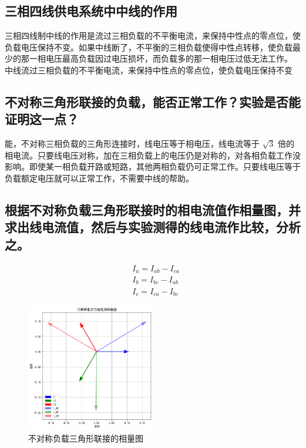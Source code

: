 \documentclass{article}
\begin{document}
\subsection{三相四线供电系统中中线的作用}
三相四线制中线的作用是流过三相负载的不平衡电流，来保持中性点的零点位，使负载电压保持不变。如果中线断了，不平衡的三相负载使得中性点转移，使负载最少的那一相电压最高负载因过电压损坏，而负载多的那一相电压过低无法工作。
中线流过三相负载的不平衡电流，来保持中性点的零点位，使负载电压保持不变



\subsection{不对称三角形联接的负载，能否正常工作？实验是否能证明这一点？ }
能，不对称三相负载的三角形连接时，线电压等于相电压，线电流等于 $\sqrt{3}$ 倍的相电流。只要线电压对称，加在三相负载上的电压仍是对称的，对各相负载工作没影响。即使某一相负载开路或短路，其他两相负载仍可正常工作。只要线电压等于负载额定电压就可以正常工作，不需要中线的帮助。

\subsection{根据不对称负载三角形联接时的相电流值作相量图，并求出线电流值，然后与实验测得的线电流作比较，分析之。}
$$
\begin{aligned}
& I_a=I_{ab}-I_{ca} \\
&I_b=I_{bc}-I_{ab}\\
& I_c=I_{ca}-I_{bc} 
\end{aligned}
$$

\begin{figure}[H]
    \centering
    \includegraphics[width=0.5\textwidth]{output2.png}
    \caption{不对称负载三角形联接的相量图}
\end{figure}
\end{document}
